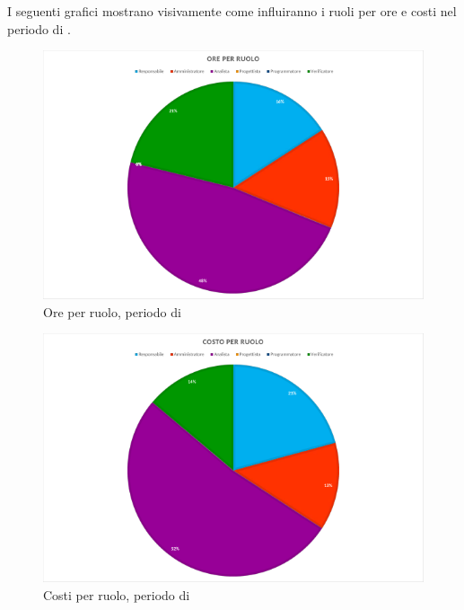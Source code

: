 I seguenti grafici mostrano visivamente come influiranno i ruoli per ore e costi nel periodo di \AR.
\begin{figure}[H]
	\centering
	\includegraphics[width=14cm]{img_peconomico/AA_OR.png}
	\caption{Ore per ruolo, periodo di \AR}
\end{figure}
\begin{figure}[H]
	\centering
	\includegraphics[width=14cm]{img_peconomico/AA_CR.png}
	\caption{Costi per ruolo, periodo di \AR}
\end{figure}

